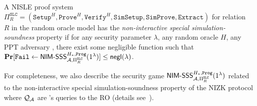 \begin{definition}
    \label{def:non-interactive-special-simulation-soundness}
    
    A NISLE proof system $\Pi^{\mathtt{SLC}}_R = (\mathtt{Setup}^H,\allowbreak \mathtt{Prove}^H,\allowbreak \mathtt{Verify}^H,\allowbreak \mathtt{SimSetup},\allowbreak \mathtt{SimProve},\allowbreak \mathtt{Extract})$ for relation $R$ in the random oracle model has the \emph{non-interactive special simulation-soundness} property if for any security parameter $\lambda$, any random oracle $H$, any PPT adversary \adv, there exist some negligible function \negl such that  $\mathbf{Pr}[\mathtt{Fail} \gets \mathsf{NIM}\text{-}\mathsf{SSS}^{H_*, \mathtt{Prog}}_{\mathcal{A}, \Pi^{\mathtt{SLC}}_R} (1^\lambda)] \le \mathsf{negl}(\lambda)$.
\end{definition}

For completeness, we also describe the security game $\mathsf{NIM}\text{-}\mathsf{SSS}^{H_*, \mathtt{Prog}}_{\mathcal{A}, \Pi^{\mathtt{SLC}}_R} (1^\lambda)$ related to the non-interactive special simulation-soundness property of the NIZK protocol where $\mathcal{Q}_\mathcal{A}$ are \adv's queries to the RO (details see~\cite{TCC:LysRos22}).


